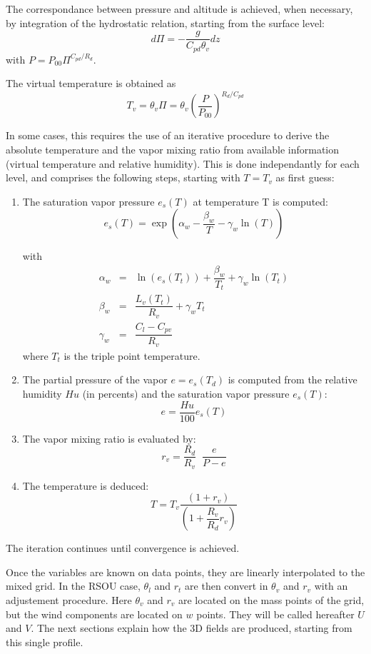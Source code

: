 The correspondance between pressure and altitude is achieved, when necessary,
by integration of the hydrostatic relation, starting from the surface level:
\begin{equation}
d \Pi = - \dfrac{g}{C_{pd} \theta_{v}}  dz
\end{equation}
with $P = P_{00} \Pi^{C_{pd}/R_{d}} $.

The virtual temperature is obtained as
\begin{equation}
T_{v} = \theta_{v} \Pi = \theta_{v} \left( \dfrac{P}{P_{00}} \right) ^{R_{d}/C_{pd}}
\end{equation}



In some cases, this requires the use of an iterative procedure
to derive the absolute temperature and the vapor mixing ratio from
available information (virtual temperature and relative humidity).
This is done independantly for each level, and
comprises the following steps, starting with $T=T_v$ as first guess:
\begin{enumerate}
\item The saturation vapor pressure $e_{s}(T)$ at temperature T is computed:
$$
e_{s}(T) =  \exp\left( \alpha_{w} - \dfrac{\beta_{w}}{T} - \gamma_{w}
\ln (T)\right)
$$

with
\begin{eqnarray*}
\alpha_{w} & = &  \ln (e_{s}(T_{t}) ) + \dfrac{\beta_{w}}{T_{t}} + \gamma_{w}
\ln (T_{t}) \\
\beta_{w} & = & \dfrac{L_{v}(T_{t})}{R_{v}} + \gamma_{w} T_{t} \\
\gamma_{w} & = & \dfrac{C_{l}-C_{pv}}{R_{v}}
\end{eqnarray*}
where $T_t$ is the triple point temperature.

\item  The partial pressure of the vapor $e= e_{s}(T_d)$
is computed from the relative humidity $Hu$ (in percents) and the saturation
vapor pressure $e_{s}(T)$:
$$
e= \dfrac{Hu}{100} e_{s}(T)
$$
\item  The vapor mixing ratio is evaluated by:
$$
r_{v} = \dfrac{R_{d}}{R_{v}} \;\; \dfrac{e}{P-e}
$$
\item   The temperature is deduced:
$$
T = T_{v} \dfrac{(1+r_{v})}{(1 + \dfrac{R_{v}}{R_{d}}r_{v})}
$$
\end{enumerate}
The iteration continues until convergence is achieved.

Once the variables are known on data points, they are linearly
interpolated to the mixed grid. In the RSOU case, $\theta_l$ and $r_t$
are then convert in $\theta_v$ and $r_v$ with an adjustement procedure.
Here $\theta_v$ and $r_v$ are located on the mass points of the grid,
but the wind components are located on $w$ points. They will be called hereafter
$U$ and $V$.  The
next sections explain how the 3D fields are produced, starting from this
single profile.\\

